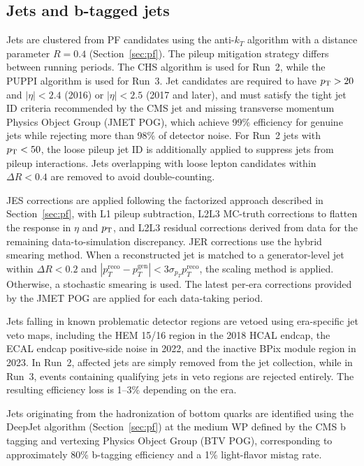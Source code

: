 \subsection{Jets and b-tagged jets}
\label{ssec:jets}

Jets are clustered from PF candidates using the anti-$k_T$ algorithm with a distance parameter $R = 0.4$ (Section~\ref{sec:pf}). The pileup mitigation strategy differs between running periods. The CHS algorithm is used for Run~2, while the PUPPI algorithm is used for Run~3. Jet candidates are required to have $p_{\mathrm{T}} > 20$\GeV and $|\eta| < 2.4$ (2016) or $|\eta| < 2.5$ (2017 and later), and must satisfy the tight jet ID criteria recommended by the CMS jet and missing transverse momentum Physics Object Group (JMET POG), which achieve 99\% efficiency for genuine jets while rejecting more than 98\% of detector noise. For Run~2 jets with $p_{\mathrm{T}} < 50$\GeV, the loose pileup jet ID is additionally applied to suppress jets from pileup interactions. Jets overlapping with loose lepton candidates within $\Delta R < 0.4$ are removed to avoid double-counting.

JES corrections are applied following the factorized approach described in Section~\ref{sec:pf}, with L1 pileup subtraction, L2L3 MC-truth corrections to flatten the response in $\eta$ and $p_{\mathrm{T}}$, and L2L3 residual corrections derived from data for the remaining data-to-simulation discrepancy. JER corrections use the hybrid smearing method. When a reconstructed jet is matched to a generator-level jet within $\Delta R < 0.2$ and $|p_T^\text{reco} - p_T^\text{gen}| < 3\sigma_{p_T} p_T^\text{reco}$, the scaling method is applied. Otherwise, a stochastic smearing is used. The latest per-era corrections provided by the JMET POG are applied for each data-taking period.

Jets falling in known problematic detector regions are vetoed using era-specific jet veto maps, including the HEM 15/16 region in the 2018 HCAL endcap, the ECAL endcap positive-side noise in 2022, and the inactive BPix module region in 2023. In Run~2, affected jets are simply removed from the jet collection, while in Run~3, events containing qualifying jets in veto regions are rejected entirely. The resulting efficiency loss is 1--3\% depending on the era.

Jets originating from the hadronization of bottom quarks are identified using the DeepJet algorithm (Section~\ref{sec:pf}) at the medium WP defined by the CMS b tagging and vertexing Physics Object Group (BTV POG), corresponding to approximately 80\% b-tagging efficiency and a 1\% light-flavor mistag rate.

